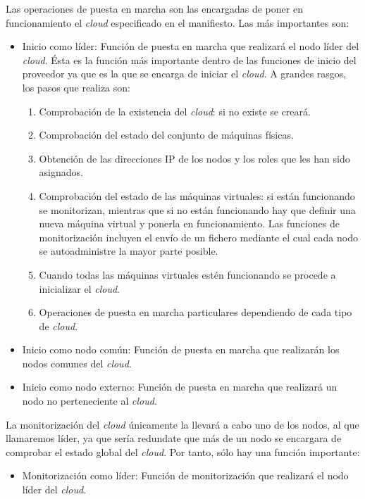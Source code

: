 Las operaciones de puesta en marcha son las encargadas de poner en funcionamiento el \emph{cloud} especificado en el manifiesto. Las más importantes son:
\begin{itemize}
\item Inicio como líder: Función de puesta en marcha que realizará el nodo líder del \emph{cloud}. Ésta es la función más importante dentro de las funciones de inicio del proveedor ya que es la que se encarga de iniciar el \emph{cloud}. A grandes rasgos, los pasos que realiza son:

   \begin{enumerate}
   \item Comprobación de la existencia del \emph{cloud}: si no existe se creará.
   \item Comprobación del estado del conjunto de máquinas físicas.
   \item Obtención de las direcciones IP de los nodos y los roles que les han sido asignados.
   \item Comprobación del estado de las máquinas virtuales: si están funcionando se monitorizan, mientras que si no están funcionando hay que definir una nueva máquina virtual y ponerla en funcionamiento. Las funciones de monitorización incluyen el envío de un fichero mediante el cual cada nodo se autoadministre la mayor parte posible.
   \item Cuando todas las máquinas virtuales estén funcionando se procede a inicializar el \emph{cloud}.
   \item Operaciones de puesta en marcha particulares dependiendo de cada tipo de \emph{cloud}.
   \end{enumerate}

\item Inicio como nodo común: Función de puesta en marcha que realizarán los nodos comunes del \emph{cloud}.
\item Inicio como nodo externo: Función de puesta en marcha que realizará un nodo no perteneciente al \emph{cloud}.
\end{itemize}

La monitorización del \emph{cloud} únicamente la llevará a cabo uno de los nodos, al que llamaremos líder, ya que sería redundate que más de un nodo se encargara de comprobar el estado global del \emph{cloud}. Por tanto, sólo hay una función importante:
\begin{itemize}
\item Monitorización como líder: Función de monitorización que realizará el nodo líder del \emph{cloud}.
\end{itemize}

